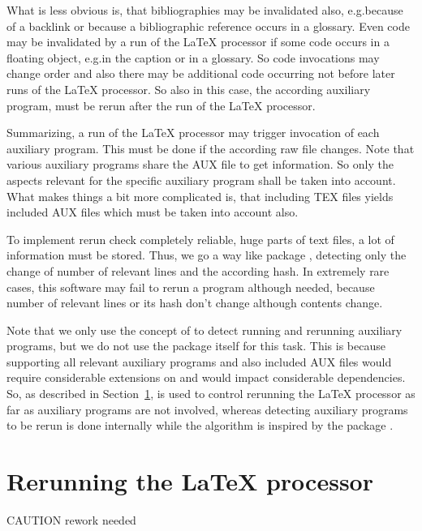 What is less obvious is, that bibliographies may be invalidated also, 
e.g.\@ because of a backlink 
or because a bibliographic reference occurs in a glossary. 
Even code may be invalidated by a run of the \LaTeX{} processor 
if some code occurs in a floating object, e.g.\@ in the caption or in a glossary. 
So code invocations may change order 
and also there may be additional code 
occurring not before later runs of the \LaTeX{} processor. 
So also in this case, the according auxiliary program,  
must be rerun after the run of the \LaTeX{} processor. 

Summarizing, a run of the \LaTeX{} processor 
may trigger invocation of each auxiliary program. 
This must be done if the according raw file changes. 
Note that various auxiliary programs share the AUX file to get information. 
So only the aspects relevant for the specific auxiliary program 
shall be taken into account. 
What makes things a bit more complicated is, 
that including TEX files yields included AUX files 
which must be taken into account also. 

To implement rerun check completely reliable, 
huge parts of text files, a lot of information must be stored. 
Thus, we go a way like package , 
detecting only the change of number of relevant lines and the according hash. 
In extremely rare cases, this software may fail to rerun a program although needed, 
because number of relevant lines or its hash don't change 
although contents change. 

Note that we only use the concept of  
to detect running and rerunning auxiliary programs, 
but we do not use the package  itself for this task. 
This is because supporting all relevant auxiliary programs and also 
included AUX files would require considerable extensions on  
and would impact considerable dependencies. 
So, as described in Section~\ref{sec:rerunLatex}, 
 is used to control rerunning the \LaTeX{} processor 
as far as auxiliary programs are not involved, 
whereas detecting auxiliary programs to be rerun is done internally 
while the algorithm is inspired by the package . 


\section{Rerunning the \LaTeX{} processor}\label{sec:rerunLatex}

CAUTION\: rework needed 

